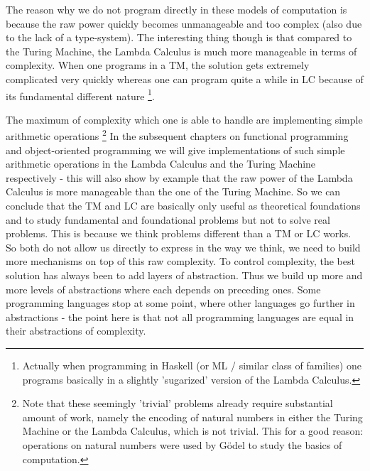 The reason why we do not program directly in these models of computation is because the raw power quickly becomes unmanageable and too complex (also due to the lack of a type-system). The interesting thing though is that compared to the Turing Machine, the Lambda Calculus is much more manageable in terms of complexity. When one programs in a TM, the solution gets extremely complicated very quickly whereas one can program quite a while in LC because of its fundamental different nature \footnote{Actually when programming in Haskell (or ML / similar class of families) one programs basically in a slightly 'sugarized' version of the Lambda Calculus.}.

The maximum of complexity which one is able to handle are implementing simple arithmetic operations \footnote{Note that these seemingly 'trivial' problems already require substantial amount of work, namely the encoding of natural numbers in either the Turing Machine or the Lambda Calculus, which is not trivial. This for a good reason: operations on natural numbers were used by Gödel to study the basics of computation.} In the subsequent chapters on functional programming and object-oriented programming we will give implementations of such simple arithmetic operations in the Lambda Calculus and the Turing Machine respectively - this will also show by example that the raw power of the Lambda Calculus is more manageable than the one of the Turing Machine.
So we can conclude that the TM and LC are basically only useful as theoretical foundations and to study fundamental and foundational problems but not to solve real problems. This is because we think problems different than a TM or LC works. So both do not allow us directly to express in the way we think, we need to build  more mechanisms on top of this raw complexity. To control complexity, the best solution has always been to add layers of abstraction. Thus we build up more and more levels of abstractions where each depends on preceding ones. Some programming languages stop at some point, where other languages go further in abstractions - the point here is that not all programming languages are equal in their abstractions of complexity.

